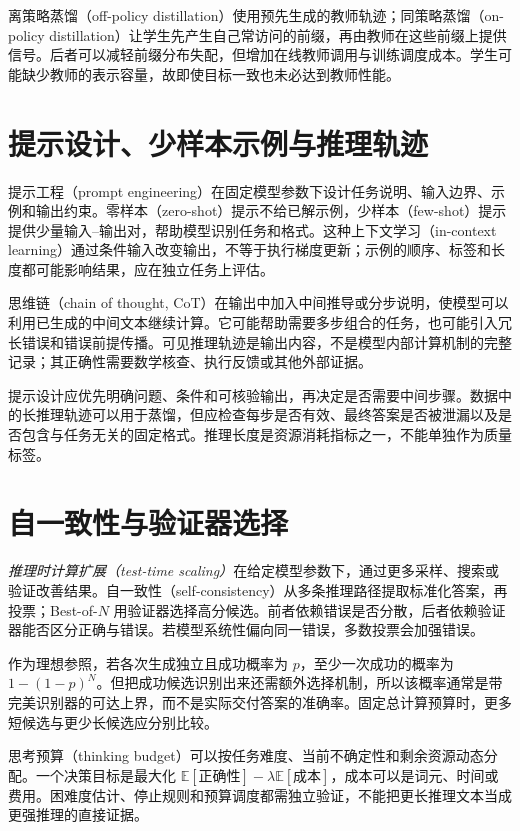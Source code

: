 离策略蒸馏（off-policy distillation）使用预先生成的教师轨迹；同策略蒸馏（on-policy distillation）让学生先产生自己常访问的前缀，再由教师在这些前缀上提供信号。后者可以减轻前缀分布失配，但增加在线教师调用与训练调度成本。学生可能缺少教师的表示容量，故即使目标一致也未必达到教师性能。

\section{提示设计、少样本示例与推理轨迹}

提示工程（prompt engineering）在固定模型参数下设计任务说明、输入边界、示例和输出约束。零样本（zero-shot）提示不给已解示例，少样本（few-shot）提示提供少量输入--输出对，帮助模型识别任务和格式。这种上下文学习（in-context learning）通过条件输入改变输出，不等于执行梯度更新；示例的顺序、标签和长度都可能影响结果，应在独立任务上评估。

思维链（chain of thought, CoT）在输出中加入中间推导或分步说明，使模型可以利用已生成的中间文本继续计算。它可能帮助需要多步组合的任务，也可能引入冗长错误和错误前提传播。可见推理轨迹是输出内容，不是模型内部计算机制的完整记录；其正确性需要数学核查、执行反馈或其他外部证据。

提示设计应优先明确问题、条件和可核验输出，再决定是否需要中间步骤。数据中的长推理轨迹可以用于蒸馏，但应检查每步是否有效、最终答案是否被泄漏以及是否包含与任务无关的固定格式。推理长度是资源消耗指标之一，不能单独作为质量标签。

\section{自一致性与验证器选择}

\emph{推理时计算扩展（test-time scaling）}在给定模型参数下，通过更多采样、搜索或验证改善结果。自一致性（self-consistency）从多条推理路径提取标准化答案，再投票\cite{selfconsistency}；Best-of-$N$ 用验证器选择高分候选。前者依赖错误是否分散，后者依赖验证器能否区分正确与错误。若模型系统性偏向同一错误，多数投票会加强错误。

作为理想参照，若各次生成独立且成功概率为 $p$，至少一次成功的概率为 $1-(1-p)^N$。但把成功候选识别出来还需额外选择机制，所以该概率通常是带完美识别器的可达上界，而不是实际交付答案的准确率。固定总计算预算时，更多短候选与更少长候选应分别比较。

思考预算（thinking budget）可以按任务难度、当前不确定性和剩余资源动态分配。一个决策目标是最大化 $\mathbb E[\text{正确性}]-\lambda\mathbb E[\text{成本}]$，成本可以是词元、时间或费用。困难度估计、停止规则和预算调度都需独立验证，不能把更长推理文本当成更强推理的直接证据。

